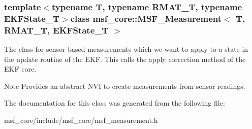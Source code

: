\subsubsection*{template$<$typename T, typename R\-M\-A\-T\-\_\-\-T, typename E\-K\-F\-State\-\_\-\-T$>$class msf\-\_\-core\-::\-M\-S\-F\-\_\-\-Measurement$<$ T, R\-M\-A\-T\-\_\-\-T, E\-K\-F\-State\-\_\-\-T $>$}

The class for sensor based measurements which we want to apply to a state in the update routine of the E\-K\-F. This calls the apply correction method of the E\-K\-F core. 

\begin{DoxyNote}{Note}
Provides an abstract N\-V\-I to create measurements from sensor readings. 
\end{DoxyNote}


The documentation for this class was generated from the following file\-:\begin{DoxyCompactItemize}
\item 
msf\-\_\-core/include/msf\-\_\-core/msf\-\_\-measurement.\-h\end{DoxyCompactItemize}
